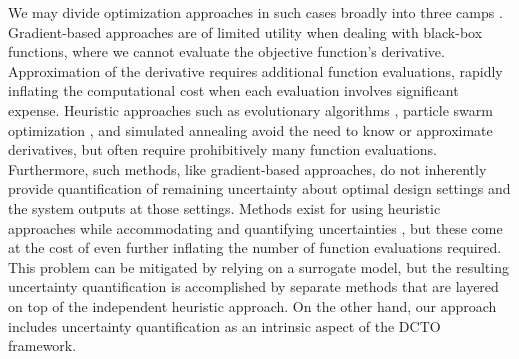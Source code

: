 \documentclass[twocolumn,10pt]{asme2ej}
\begin{document}
%
We may divide optimization approaches in such cases broadly into three camps \cite{Regis2004}.
%
Gradient-based approaches \cite{Nocedal2006} are of limited utility when dealing with black-box functions, where we cannot evaluate the objective function's derivative.
%
Approximation of the derivative requires additional function evaluations, rapidly inflating the computational cost when each evaluation involves significant expense.
%
Heuristic approaches \cite{Lee2007} such as evolutionary algorithms \cite{Branke2008,Deb2002,Kim2004}, particle swarm optimization \cite{Bonyadi2017,Mason2017}, and simulated annealing \cite{Robert2004} avoid the need to know or approximate derivatives, but often require prohibitively many function evaluations.
%
Furthermore, such methods, like gradient-based approaches, do not inherently provide quantification of remaining uncertainty about optimal design settings and the system outputs at those settings.
%
Methods exist for using heuristic approaches while accommodating and quantifying uncertainties \cite{Deb2006,Zhou2011b}, but these come at the cost of even further inflating the number of function evaluations required.
%
This problem can be mitigated by relying on a surrogate model, but the resulting uncertainty quantification is accomplished by separate methods that are layered on top of the independent heuristic approach.
%
On the other hand, our approach includes uncertainty quantification as an intrinsic aspect of the DCTO framework.
%
\end{document}
